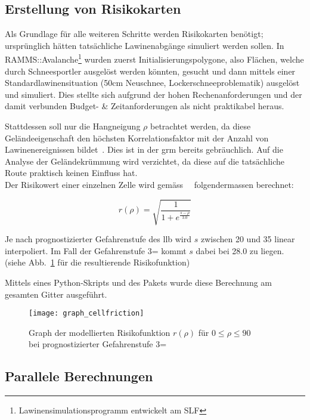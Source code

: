 \subsection{Erstellung von Risikokarten}

Als Grundlage für alle weiteren Schritte werden Risikokarten benötigt; ursprünglich hätten tatsächliche Lawinenabgänge simuliert werden sollen. In RAMMS::Avalanche\footnote{Lawinensimulationsprogramm entwickelt am SLF} wurden zuerst Initialisierungspolygone, also Flächen, welche durch Schneesportler ausgelöst werden könnten, gesucht und dann mittels einer Standardlawinensituation (50cm Neuschnee, Lockerschneeproblematik) ausgelöst und simuliert. Dies stellte sich aufgrund der hohen Rechenanforderungen und der damit verbunden Budget- \& Zeitanforderungen als nicht praktikabel heraus.

Stattdessen soll nur die Hangneigung $\rho$ betrachtet werden, da diese Geländeeigenschaft den höchsten Korrelationsfaktor mit der Anzahl von Lawinenereignissen bildet~\cite{arpddatasetdocs}. Dies ist in der \gls{grm} bereits gebräuchlich. Auf die Analyse der Geländekrümmung wird verzichtet, da diese auf die tatsächliche Route praktisch keinen Einfluss hat.\\
Der Risikowert einer einzelnen Zelle wird gemäss~\citeauthor{sacbergspwinterp99}~\cite{sacbergspwinterp99} folgendermassen berechnet:

\[
r(\rho) = \sqrt{\frac{1}{1 + e^{\frac{s-\rho}{3.0}}}}
\]

Je nach prognostizierter Gefahrenstufe des \gls{llb} wird $s$ zwischen 20 und 35 linear interpoliert. Im Fall der Gefahrenstufe 3= kommt $s$ dabei bei 28.0 zu liegen. (siehe Abb.~\ref{fig:graph} für die resultierende Risikofunktion)

Mittels eines Python-Skripts und des Pakets  wurde diese Berechnung am gesamten Gitter ausgeführt.

\begin{figure}[H]
  \centering
  \texttt{[image: graph\_cellfriction]}
  \caption{Graph der modellierten Risikofunktion $r(\rho)$ für $0 \leq \rho \leq 90$ \\bei prognostizierter Gefahrenstufe 3=}\label{fig:graph}
\end{figure}

\subsection{Parallele Berechnungen}

